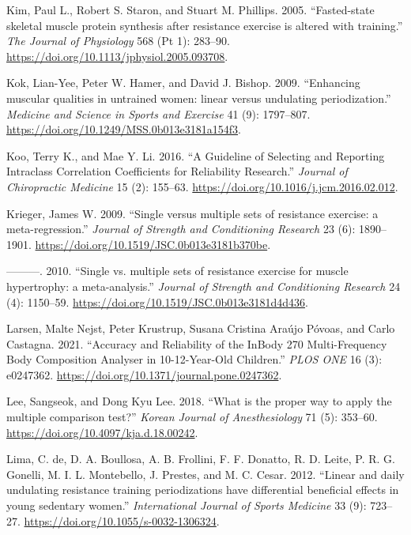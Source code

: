 \documentclass[
  letterpaper,
  DIV=11,
  numbers=noendperiod]{scrreprt}
\newlength{\cslhangindent}
\newlength{\cslentryspacingunit} %
\newenvironment{CSLReferences}[2] %
 {%
  \setlength{\parindent}{0pt}
  \ifodd #1
  \let\oldpar\par
  \def\par{\hangindent=\cslhangindent\oldpar}
  \fi
  \setlength{\parskip}{#2\cslentryspacingunit}
 }%
 {}
\begin{document}
\begin{CSLReferences}{1}{0}
\leavevmode{}%
Kim, Paul L., Robert S. Staron, and Stuart M. Phillips. 2005.
{``Fasted-state skeletal muscle protein synthesis after resistance
exercise is altered with training.''} \emph{The Journal of Physiology}
568 (Pt 1): 283--90. \url{https://doi.org/10.1113/jphysiol.2005.093708}.

\leavevmode{}%
Kok, Lian-Yee, Peter W. Hamer, and David J. Bishop. 2009. {``Enhancing
muscular qualities in untrained women: linear versus undulating
periodization.''} \emph{Medicine and Science in Sports and Exercise} 41
(9): 1797--807. \url{https://doi.org/10.1249/MSS.0b013e3181a154f3}.

\leavevmode{}%
Koo, Terry K., and Mae Y. Li. 2016. {``A Guideline of Selecting and
Reporting Intraclass Correlation Coefficients for Reliability
Research.''} \emph{Journal of Chiropractic Medicine} 15 (2): 155--63.
\url{https://doi.org/10.1016/j.jcm.2016.02.012}.

\leavevmode{}%
Krieger, James W. 2009. {``Single versus multiple sets of resistance
exercise: a meta-regression.''} \emph{Journal of Strength and
Conditioning Research} 23 (6): 1890--1901.
\url{https://doi.org/10.1519/JSC.0b013e3181b370be}.

\leavevmode{}%
---------. 2010. {``Single vs. multiple sets of resistance exercise for
muscle hypertrophy: a meta-analysis.''} \emph{Journal of Strength and
Conditioning Research} 24 (4): 1150--59.
\url{https://doi.org/10.1519/JSC.0b013e3181d4d436}.

\leavevmode{}%
Larsen, Malte Nejst, Peter Krustrup, Susana Cristina Araújo Póvoas, and
Carlo Castagna. 2021. {``Accuracy and Reliability of the InBody 270
Multi-Frequency Body Composition Analyser in 10-12-Year-Old Children.''}
\emph{PLOS ONE} 16 (3): e0247362.
\url{https://doi.org/10.1371/journal.pone.0247362}.

\leavevmode{}%
Lee, Sangseok, and Dong Kyu Lee. 2018. {``What is the proper way to
apply the multiple comparison test?''} \emph{Korean Journal of
Anesthesiology} 71 (5): 353--60.
\url{https://doi.org/10.4097/kja.d.18.00242}.

\leavevmode{}%
Lima, C. de, D. A. Boullosa, A. B. Frollini, F. F. Donatto, R. D. Leite,
P. R. G. Gonelli, M. I. L. Montebello, J. Prestes, and M. C. Cesar.
2012. {``Linear and daily undulating resistance training periodizations
have differential beneficial effects in young sedentary women.''}
\emph{International Journal of Sports Medicine} 33 (9): 723--27.
\url{https://doi.org/10.1055/s-0032-1306324}.


\end{CSLReferences}
\end{document}
